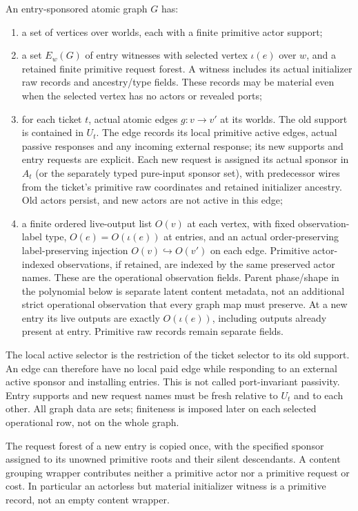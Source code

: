 \documentclass[11pt]{article}
\begin{document}
An entry-sponsored atomic graph $G$ has:
\begin{enumerate}
\item a set of vertices over worlds, each with a finite primitive actor support;
\item a set $E_w(G)$ of entry witnesses with selected vertex $\iota(e)$ over $w$, and a retained finite primitive request forest. A witness includes its actual initializer raw records and ancestry/type fields. These records may be material even when the selected vertex has no actors or revealed ports;
\item for each ticket $t$, actual atomic edges $g:v\to v'$ at its worlds. The old support is contained in $U_t$. The edge records its local primitive active edges, actual passive responses and any incoming external response; its new supports and entry requests are explicit. Each new request is assigned its actual sponsor in $A_t$ (or the separately typed pure-input sponsor set), with predecessor wires from the ticket's primitive raw coordinates and retained initializer ancestry. Old actors persist, and new actors are not active in this edge;
\item a finite ordered live-output list $O(v)$ at each vertex, with fixed observation-label type, $O(e)=O(\iota(e))$ at entries, and an actual order-preserving label-preserving injection $O(v)\hookrightarrow O(v')$ on each edge. Primitive actor-indexed observations, if retained, are indexed by the same preserved actor names. These are the operational observation fields. Parent phase/shape in the polynomial below is separate latent content metadata, not an additional strict operational observation that every graph map must preserve. At a new entry its live outputs are exactly $O(\iota(e))$, including outputs already present at entry. Primitive raw records remain separate fields.
\end{enumerate}
The local active selector is the restriction of the ticket selector to its old support. An edge can therefore have no local paid edge while responding to an external active sponsor and installing entries. This is not called port-invariant passivity. Entry supports and new request names must be fresh relative to $U_t$ and to each other. All graph data are sets; finiteness is imposed later on each selected operational row, not on the whole graph.

The request forest of a new entry is copied once, with the specified sponsor assigned to its unowned primitive roots and their silent descendants. A content grouping wrapper contributes neither a primitive actor nor a primitive request or cost. In particular an actorless but material initializer witness is a primitive record, not an empty content wrapper.
\end{document}
